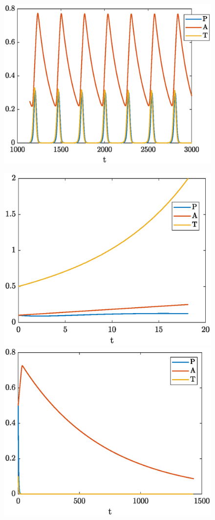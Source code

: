 \documentclass[review,authoryear]{elsarticle}
\begin{document}
\begin{figure}[h]
\centerline{\includegraphics[width=0.3\paperwidth]{figs/time-course-PAT-periodic-DA-pat4}}
\centerline{\includegraphics[width=0.3\paperwidth]{figs/time-course-PAT-tumor-escape-dePilis}\includegraphics[width=0.3\paperwidth]{figs/time-course-PAT-tumor-eliminate-dePilis}}

\end{figure}
\end{document}
